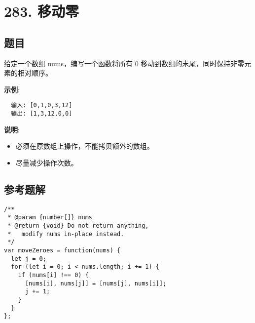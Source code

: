 \newpage
\section{283. 移动零}
\label{leetcode:283}

\subsection{题目}

给定一个数组 nums，编写一个函数将所有 0 移动到数组的末尾，同时保持非零元素的相对顺序。

\textbf{示例}:

\begin{verbatim}
  输入: [0,1,0,3,12]
  输出: [1,3,12,0,0]
\end{verbatim}

\textbf{说明}:

\begin{itemize}
  \item 必须在原数组上操作，不能拷贝额外的数组。
  \item 尽量减少操作次数。
\end{itemize}

\subsection{参考题解}

\begin{verbatim}
/**
 * @param {number[]} nums
 * @return {void} Do not return anything, 
 *   modify nums in-place instead.
 */
var moveZeroes = function(nums) {
  let j = 0;
  for (let i = 0; i < nums.length; i += 1) {
    if (nums[i] !== 0) {
      [nums[i], nums[j]] = [nums[j], nums[i]];
      j += 1;
    }
  }
};
\end{verbatim}
